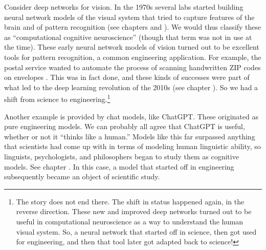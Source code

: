 Consider deep networks for vision. In the 1970s several labs started building neural network models of the visual system that tried to capture features of the brain and of pattern recognition (see chapters  and  ).  We would thus classify these as ``computational cognitive neuroscience'' (though that term was not in use at the time).  These early neural network models of vision turned out to be excellent tools for pattern recognition, a common engineering application. For example, the postal service wanted to automate the process of scanning handwritten ZIP codes on envelopes \cite{lecun1989backpropagation}. This was in fact done, and these kinds of successes were part of what led to the deep learning revolution of the 2010s (see chapter ). So we had a shift from science to engineering.\footnote{The story does not end there. The shift in status happened again, in the reverse direction. These new and improved deep networks turned out to be useful in computational neuroscience as a way to understand the human visual system. So, a neural network that started off in science, then got used for engineering, and then that tool later got adapted back to science!}

Another example is provided by chat models, like ChatGPT. These originated as pure engineering models. We can probably all agree that ChatGPT is useful, whether or not it ``thinks like a human.'' Models like this far surpassed anything that scientists had come up with in terms of modeling human linguistic ability, so linguists, psychologists, and philosophers began to study them as cognitive models. See chapter . In this case, a model that started off in engineering subsequently became an object of scientific study.

 
